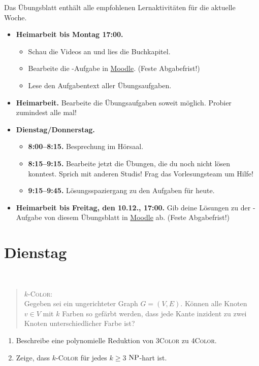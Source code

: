 \documentclass{uebung_cs}
\begin{document}
Das Übungsblatt enthält alle empfohlenen Lernaktivitäten für die aktuelle Woche.

\begin{itemize}
\item \textbf{Heimarbeit bis Montag 17:00.}
    \begin{itemize}
    \item 
    Schau die Videos an und lies die Buchkapitel.
    \item Bearbeite die -Aufgabe in \href{https://moodle.studiumdigitale.uni-frankfurt.de/moodle/course/view.php?id=2241}{Moodle}. (Feste Abgabefrist!)
    \item Lese den Aufgabentext aller Übungsaufgaben.
    \end{itemize}
\item \textbf{Heimarbeit.} Bearbeite die Übungsaufgaben soweit möglich. Probier zumindest alle mal!
\item \textbf{Dienstag/Donnerstag.}
\begin{itemize}
    \item \textbf{8:00--8:15.} Besprechung im Hörsaal.
    \item \textbf{8:15--9:15.} Bearbeite jetzt die Übungen, die du noch nicht lösen konntest. Sprich mit anderen Studis! Frag das Vorlesungsteam um Hilfe!
    \item \textbf{9:15--9:45.} Lösungsspaziergang zu den Aufgaben für heute.
\end{itemize}

\item \textbf{Heimarbeit bis Freitag, den 10.12., 17:00.} Gib deine Lösungen zu der -Aufgabe von diesem Übungsblatt in \href{https://moodle.studiumdigitale.uni-frankfurt.de/moodle/course/view.php?id=2241}{Moodle} ab. (Feste Abgabefrist!)
\end{itemize}

\section*{Dienstag}

\begin{exercise}[k-COLOR]\
	\begin{quote}
		$k$-\textsc{Color}:\\
		Gegeben sei ein ungerichteter Graph $G = (V,E)$. Können alle Knoten $v \in V$ mit $k$ Farben so gefärbt werden, dass jede Kante inzident zu zwei Knoten unterschiedlicher Farbe ist?
	\end{quote}
	\begin{enumerate}
		\item Beschreibe eine polynomielle Reduktion von \textsc{3Color} zu \textsc{4Color}.
		\item Zeige, dass $k$-\textsc{Color} für jedes $k \geq 3$ $\mathrm{NP}$-hart ist.
	\end{enumerate}
\end{exercise}
\end{document}
